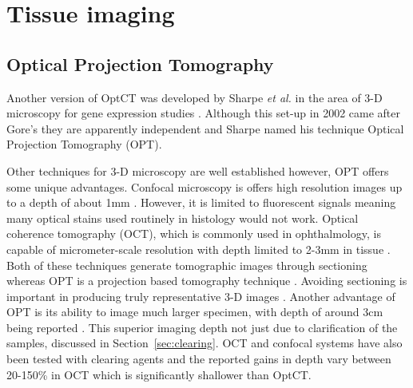 \documentclass[12pt]{article}
\begin{document}

 









\newpage
\section{Tissue imaging}
\subsection{Optical Projection Tomography}

Another version of OptCT was  developed by Sharpe \textit{et al.} in the area of 3-D microscopy for gene expression studies \cite{Sharpe:2002jp}. Although this set-up in 2002 came after Gore's they are apparently independent and Sharpe named his technique Optical Projection Tomography (OPT).

Other techniques for 3-D microscopy are well established however, OPT offers some unique advantages. 
Confocal microscopy is offers high resolution images up to a depth of about 1mm \cite{Webb:1996}. However, it is limited to fluorescent signals meaning many optical stains used routinely in histology would not work. Optical coherence tomography (OCT), which is commonly used in ophthalmology, is capable of micrometer-scale resolution with  depth limited to 2-3mm in tissue \cite{huang1993optical}. Both of these techniques generate tomographic images through sectioning whereas OPT is a projection based tomography technique \cite{Sharpe:2003cm}. Avoiding sectioning is important in producing truly representative 3-D images \cite{Oldham:2007ku}. Another advantage of  OPT is its ability to  image much larger specimen, with depth of around 3cm being reported \cite{Oldham:2007ku}. This superior imaging depth not just due to clarification of the samples, discussed in Section~\ref{sec:clearing}. OCT and confocal systems have also been tested with clearing agents and the reported gains in depth vary between 20-150\% in OCT \cite{Tuchin:2002} which is significantly shallower than OptCT.
\end{document}
